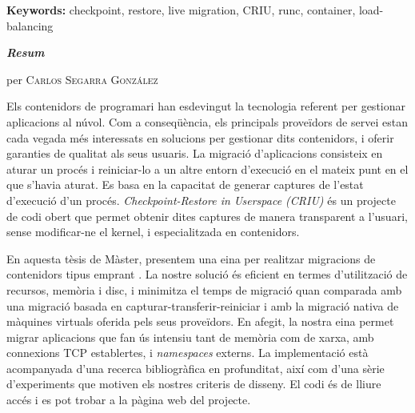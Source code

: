 \vspace{0.5cm}

\textbf{Keywords:} checkpoint, restore, live migration, CRIU, runc, container, load-balancing

\vfill
\pagebreak

\vspace*{1.5cm}
\begin{center}
    \LARGE
    \textit{\textbf{Resum}} 

    \vspace{0.5cm}

    \large
    \textbf{\titleEN}

    per \textsc{Carlos Segarra Gonz\'alez}
\end{center}

\vspace{0.5cm}

\normalsize

Els contenidors de programari han esdevingut la tecnologia referent per gestionar aplicacions al n\'uvol.
Com a conseq\"u\`encia, els principals prove\"idors de servei estan cada vegada m\'es interessats en solucions per gestionar dits contenidors, i oferir garanties de qualitat als seus usuaris.
La migraci\'o d'aplicacions consisteix en aturar un proc\'es i reiniciar-lo a un altre entorn d'execuci\'o en el mateix punt en el que s'havia aturat.
Es basa en la capacitat de generar captures de l'estat d'execuci\'o d'un proc\'es.
\textit{Checkpoint-Restore in Userspace (CRIU)} \'es un projecte de codi obert que permet obtenir dites captures de manera transparent a l'usuari, sense modificar-ne el kernel, i especialitzada en contenidors.

En aquesta t\`esis de M\`aster, presentem una eina per realitzar migracions de contenidors tipus \runc emprant \criu.
La nostre soluci\'o \'es eficient en termes d'utilitzaci\'o de recursos, mem\`oria i disc, i minimitza el temps de migraci\'o quan comparada amb una migraci\'o basada en capturar-transferir-reiniciar i amb la migraci\'o nativa de m\`aquines virtuals oferida pels seus prove\"idors.
En afegit, la nostra eina permet migrar aplicacions que fan \'us intensiu tant de mem\`oria com de xarxa, amb connexions TCP establertes, i \textit{namespaces} externs.
La implementaci\'o est\`a acompanyada d'una recerca bibliogr\`afica en profunditat, aix\'i com d'una s\`erie d'experiments que motiven els nostres criteris de disseny.
El codi \'es de lliure acc\'es i es pot trobar a la p\`agina web del projecte.


